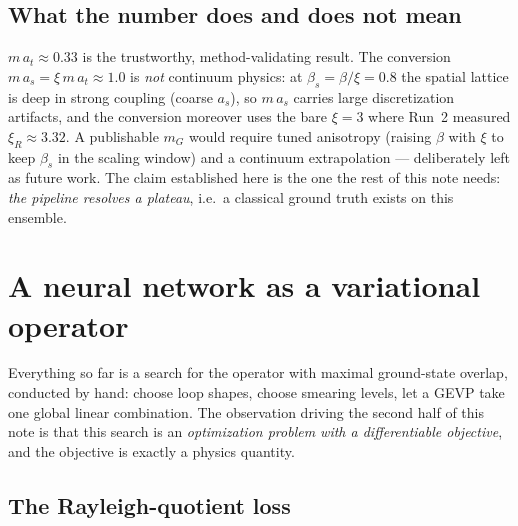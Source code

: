 \documentclass[11pt,a4paper]{article}
\newcommand{\at}{a_t}
\newcommand{\as}{a_s}
\begin{document}
\subsection{What the number does and does not mean}
\label{sec:caveat}

$m\,\at\approx0.33$ is the trustworthy, method-validating result. The
conversion $m\,\as = \xi\, m\,\at \approx 1.0$ is \emph{not} continuum
physics: at $\beta_s=\beta/\xi=0.8$ the spatial lattice is deep in strong
coupling (coarse $\as$), so $m\,\as$ carries large discretization artifacts,
and the conversion moreover uses the bare $\xi=3$ where Run~2 measured
$\xi_R\approx3.32$. A publishable $m_G$ would require tuned anisotropy
(raising $\beta$ with $\xi$ to keep $\beta_s$ in the scaling window) and a
continuum extrapolation --- deliberately left as future work. The claim
established here is the one the rest of this note needs: \emph{the pipeline
resolves a plateau}, i.e.\ a classical ground truth exists on this ensemble.

\section{A neural network as a variational operator}
\label{sec:learned}

Everything so far is a search for the operator with maximal ground-state
overlap, conducted by hand: choose loop shapes, choose smearing levels, let a
GEVP take one global linear combination. The observation driving the second
half of this note is that this search is an \emph{optimization problem with a
differentiable objective}, and the objective is exactly a physics quantity.

\subsection{The Rayleigh-quotient loss}
\label{sec:rayleigh}
\end{document}
